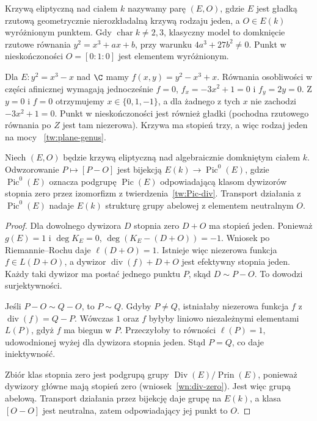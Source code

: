 \begin{definicja}
Krzywą eliptyczną nad ciałem $k$ nazywamy
parę $(E,O)$, gdzie $E$ jest gładką
rzutową geometrycznie nierozkładalną krzywą
rodzaju jeden, a $O\in E(k)$ wyróżnionym
punktem. Gdy $\operatorname{char}k\ne2,3$,
klasyczny model to domknięcie rzutowe równania
$y^2=x^3+ax+b$, przy warunku
$4a^3+27b^2\ne0$. Punkt w nieskończoności
$O=[0:1:0]$ jest elementem wyróżnionym.
\end{definicja}

\begin{przyklad}
Dla $E:y^2=x^3-x$ nad $\C$ mamy
$f(x,y)=y^2-x^3+x$. Równania osobliwości
w części afinicznej wymagają jednocześnie
$f=0$, $f_x=-3x^2+1=0$ i $f_y=2y=0$.
Z $y=0$ i $f=0$ otrzymujemy
$x\in\{0,1,-1\}$, a dla żadnego z tych $x$
nie zachodzi $-3x^2+1=0$. Punkt w nieskończoności
jest również gładki (pochodna rzutowego równania
po $Z$ jest tam niezerowa). Krzywa ma stopień trzy,
a więc rodzaj jeden na mocy
~\ref{tw:plane-genus}.
\end{przyklad}

\begin{twierdzenie}
\label{tw:elliptic-group}
Niech $(E,O)$ będzie krzywą eliptyczną nad
algebraicznie domkniętym ciałem $k$.
Odwzorowanie $P\mapsto[P-O]$ jest bijekcją
$E(k)\to\operatorname{Pic}^0(E)$, gdzie
$\operatorname{Pic}^0(E)$ oznacza podgrupę
$\operatorname{Pic}(E)$ odpowiadającą klasom
dywizorów stopnia zero przez izomorfizm
z twierdzenia~\ref{tw:Pic-div}.
Transport działania z $\operatorname{Pic}^0(E)$
nadaje $E(k)$ strukturę grupy abelowej
z elementem neutralnym $O$.
\end{twierdzenie}
\begin{proof}
Dla dowolnego dywizora $D$ stopnia zero
$D+O$ ma stopień jeden. Ponieważ $g(E)=1$
i $\deg K_E=0$,
$\deg(K_E-(D+O))=-1$. Wniosek po Riemannie--Rochu
daje $\ell(D+O)=1$. Istnieje więc niezerowa funkcja
$f\in L(D+O)$, a dywizor
$\operatorname{div}(f)+D+O$ jest efektywny
stopnia jeden. Każdy taki dywizor ma postać
jednego punktu $P$, skąd $D\sim P-O$.
To dowodzi surjektywności.

Jeśli $P-O\sim Q-O$, to $P\sim Q$.
Gdyby $P\ne Q$, istniałaby niezerowa funkcja
$f$ z $\operatorname{div}(f)=Q-P$.
Wówczas $1$ oraz $f$ byłyby liniowo niezależnymi
elementami $L(P)$, gdyż $f$ ma biegun w $P$.
Przeczyłoby to równości $\ell(P)=1$,
udowodnionej wyżej dla dywizora stopnia jeden.
Stąd $P=Q$, co daje iniektywność.

Zbiór klas stopnia zero jest podgrupą grupy
$\operatorname{Div}(E)/\operatorname{Prin}(E)$,
ponieważ dywizory główne mają stopień zero
(wniosek~\ref{wn:div-zero}). Jest więc grupą
abelową. Transport działania przez bijekcję
daje grupę na $E(k)$, a klasa $[O-O]$ jest
neutralna, zatem odpowiadający jej punkt to $O$.
\end{proof}

